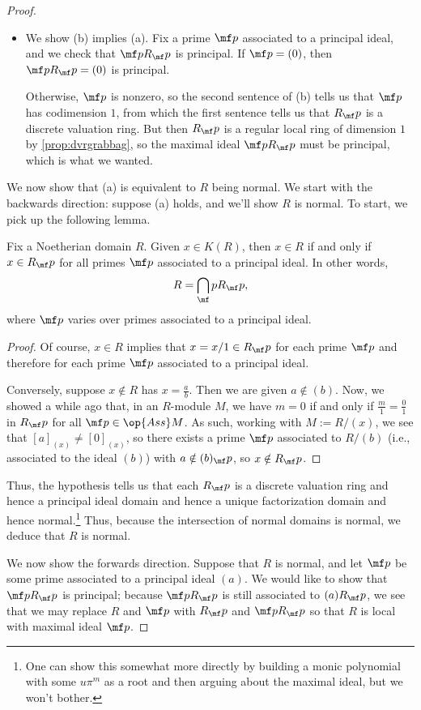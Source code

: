 \documentclass[../notes.tex]{subfiles}
\begin{document}
\begin{proof}
\begin{itemize}
		\item We show (b) implies (a). Fix a prime $\mf p$ associated to a principal ideal, and we check that $\mf pR_\mf p$ is principal. If $\mf p=(0)$, then $\mf pR_\mf p=(0)$ is principal.

		Otherwise, $\mf p$ is nonzero, so the second sentence of (b) tells us that $\mf p$ has codimension $1$, from which the first sentence tells us that $R_\mf p$ is a discrete valuation ring. But then $R_\mf p$ is a regular local ring of dimension $1$ by \autoref{prop:dvrgrabbag}, so the maximal ideal $\mf pR_\mf p$ must be principal, which is what we wanted.
	\end{itemize}
	We now show that (a) is equivalent to $R$ being normal. We start with the backwards direction: suppose (a) holds, and we'll show $R$ is normal. To start, we pick up the following lemma.
	\begin{lemma}
		Fix a Noetherian domain $R$. Given $x\in K(R)$, then $x\in R$ if and only if $x\in R_\mf p$ for all primes $\mf p$ associated to a principal ideal. In other words,
		\[R=\bigcap_\mf pR_\mf p,\]
		where $\mf p$ varies over primes associated to a principal ideal.
	\end{lemma}
	\begin{proof}
		Of course, $x\in R$ implies that $x=x/1\in R_\mf p$ for each prime $\mf p$ and therefore for each prime $\mf p$ associated to a principal ideal.

		Conversely, suppose $x\notin R$ has $x=\frac ab$. Then we are given $a\notin(b)$. Now, we showed a while ago that, in an $R$-module $M$, we have $m=0$ if and only if $\frac m1=\frac01$ in $R_\mf p$ for all $\mf p\in\op{Ass}M$. As such, working with $M:=R/(x)$, we see that $[a]_{(x)}\ne[0]_{(x)}$, so there exists a prime $\mf p$ associated to $R/(b)$ (i.e., associated to the ideal $(b)$) with $a\notin(b)_\mf p$, so $x\notin R_\mf p$.
	\end{proof}
	Thus, the hypothesis tells us that each $R_\mf p$ is a discrete valuation ring and hence a principal ideal domain and hence a unique factorization domain and hence normal.\footnote{One can show this somewhat more directly by building a monic polynomial with some $u\pi^m$ as a root and then arguing about the maximal ideal, but we won't bother.} Thus, because the intersection of normal domains is normal, we deduce that $R$ is normal.

	We now show the forwards direction. Suppose that $R$ is normal, and let $\mf p$ be some prime associated to a principal ideal $(a)$. We would like to show that $\mf pR_\mf p$ is principal; because $\mf pR_\mf p$ is still associated to $(a)R_\mf p$, we see that we may replace $R$ and $\mf p$ with $R_\mf p$ and $\mf pR_\mf p$ so that $R$ is local with maximal ideal $\mf p$.


\end{proof}
\end{document}

